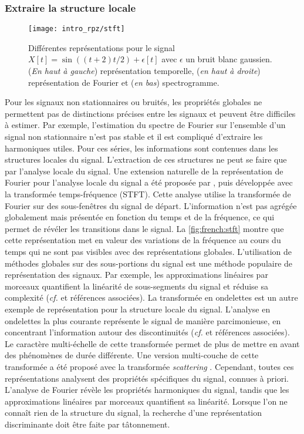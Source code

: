 \documentclass[../thesis.tex]{subfiles}
\begin{document}
\subsubsection{Extraire la structure locale}

\begin{figure}[tp]
	\centering
	\texttt{[image: intro\_rpz/stft]}
	\caption{Différentes représentations  pour le signal $X[t] = \sin((t+2)t/2)
	+ \epsilon[t]$ avec $\epsilon$ un bruit blanc gaussien. (\emph{En haut à gauche}) représentation temporelle,
	(\emph{en haut à droite}) représentation de Fourier et (\emph{en bas}) spectrogramme.
	}
	\label{fig:french:stft}
\end{figure}

	Pour les signaux non stationnaires ou bruités, les propriétés globales ne permettent
	pas de distinctions précises entre les signaux et peuvent être difficiles à estimer.
	Par exemple, l'estimation du spectre de Fourier sur l'ensemble d'un signal non
	stationnaire n'est pas stable et il est compliqué d'extraire les harmoniques utiles.
	Pour ces séries, les informations sont contenues dans les structures locales du
	signal. L'extraction de ces structures ne peut se faire que par l'analyse locale
	du signal. Une extension naturelle de la représentation de Fourier pour l'analyse
	locale du signal a été proposée par \citet{Gabor1946}, puis développée avec la
	transformée temps-fréquence (STFT). Cette analyse utilise la transformée de Fourier
	sur des sous-fenêtres du signal de départ. L'information n'est pas agrégée globalement
	mais présentée en fonction du temps et de la fréquence, ce qui permet de révéler les
	transitions dans le signal. La \autoref{fig:french:stft} montre que cette représentation
	met en valeur des variations de la fréquence au cours du temps qui ne sont pas visibles
	avec des représentations globales. L'utilisation de méthodes globales sur des sous-portions
	du signal est une méthode populaire de représentation des signaux. Par exemple, les
	approximations linéaires par morceaux quantifient la linéarité de sous-segments du signal
	et réduise sa complexité (\emph{cf.} \citealt{Keogh2001} et références associées). La
	transformée en ondelettes est un autre exemple de représentation pour la structure locale
	du signal. L'analyse en ondelettes la plus courante représente le signal de manière
	parcimonieuse, en concentrant l'information autour des discontinuités (\emph{cf.}
	\citealt{Mallat2008} et références associées). Le caractère multi-échelle de cette
	transformée permet de plus de mettre en avant des phénomènes de durée différente.
	Une version multi-couche de cette transformée a été proposé avec la transformée
	\emph{scattering} \citep{Mallat2012}. Cependant, toutes ces représentations analysent
	des propriétés spécifiques du signal, connues à priori. L'analyse de Fourier révèle
	les propriétés harmoniques du signal, tandis que les approximations linéaires par
	morceaux quantifient sa linéarité. Lorsque l'on ne connaît rien de la structure du
	signal, la recherche d'une représentation discriminante doit être faite par tâtonnement.
\end{document}

